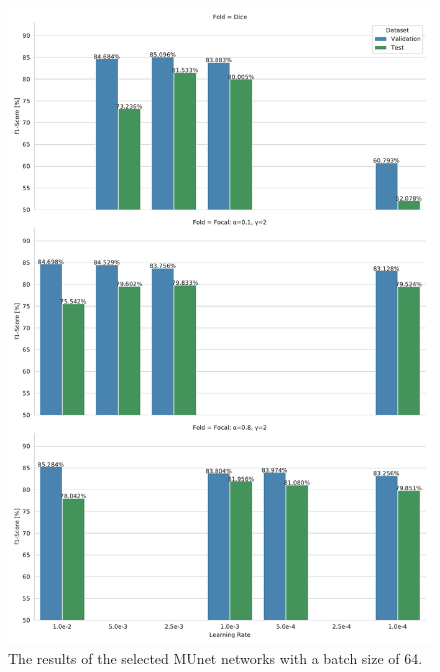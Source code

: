 \begin{figure}
\begin{center}
    \includegraphics[height=\textheight]{imgs/munet_folds_bs64.pdf}
    \caption{The results of the selected \ac{MUnet} networks with a batch size of 64.}
    \label{fig:munet_fold_64}
\end{center}
\end{figure}
